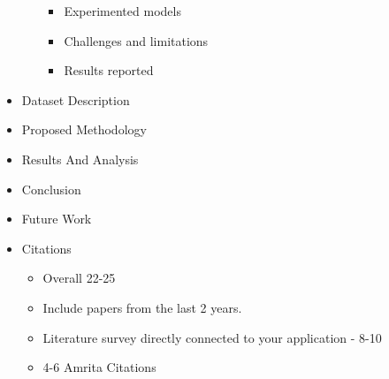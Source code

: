\documentclass[11pt]{article}
\begin{document}
\begin{itemize}
\begin{itemize}
\begin{itemize}
\item Experimented models
\item Challenges and limitations
\item Results reported
\end{itemize}
\end{itemize}
\item Dataset Description
\item Proposed Methodology
\item Results And Analysis
\item Conclusion
\item Future Work
\item Citations
\begin{itemize}
\item Overall 22-25
\item Include papers from the last 2 years.
\item Literature survey directly connected to your application - 8-10
\item 4-6 Amrita Citations
\end{itemize}
\end{itemize}
\end{document}
